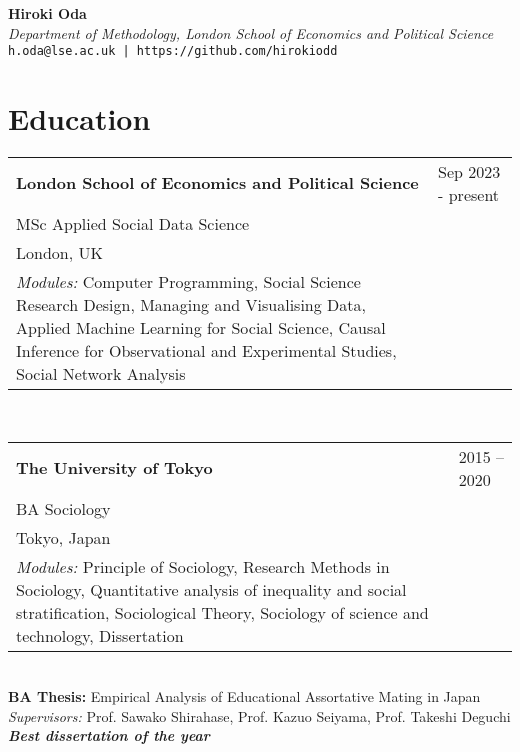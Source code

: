 \documentclass[11pt, a4paper]{article}
\begin{document}
\begin{center}
{\huge \textbf{Hiroki Oda}} \\
\vspace{5pt}
{\large \textit{Department of Methodology, London School of Economics and Political Science}} \\
\texttt{h.oda@lse.ac.uk | https://github.com/hirokiodd} \\
\end{center}


\section*{Education}
\noindent\begin{tabular}{@{}p{}p{}}
\textbf{London School of Economics and Political Science} & \hfill Sep 2023 - present \\
MSc Applied Social Data Science \\
London, UK \\
\textit{Modules:} Computer Programming, Social Science Research Design, Managing and Visualising Data, Applied Machine Learning for Social Science, Causal Inference for Observational and Experimental Studies, Social Network Analysis \\
\end{tabular} \\

\noindent\begin{tabular}{@{}p{}p{}} \\
\textbf{The University of Tokyo} & \hfill 2015 -- 2020 \\
BA Sociology \\
Tokyo, Japan \\
\textit{Modules:} Principle of Sociology, Research Methods in Sociology, Quantitative analysis of inequality and social stratification, Sociological Theory, Sociology of science and technology, Dissertation \\
\end{tabular} \\

\noindent \textbf{BA Thesis:} Empirical Analysis of Educational Assortative Mating in Japan \\
\textit{Supervisors:} Prof. Sawako Shirahase, Prof. Kazuo Seiyama, Prof. Takeshi Deguchi \\
\textit{\textbf{Best dissertation of the year}} \\
\end{document}
